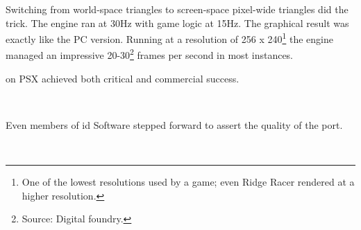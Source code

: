 Switching from world-space triangles to screen-space pixel-wide triangles did the trick. The engine ran at 30Hz with game logic at 15Hz. The graphical result was exactly like the PC version. Running at a resolution of 256 x 240\footnote{One of the lowest resolutions used by a game; even Ridge Racer rendered at a higher resolution.} the engine managed an impressive 20-30\footnote{Source: Digital foundry.} frames per second in most instances.\\
\par
\doom{} on PSX achieved both critical and commercial success.\\
\par 
{}\\ 
\par
Even members of id Software stepped forward to assert the quality of the port.\\
\par
{}\\
\par
{}

\pagebreak
